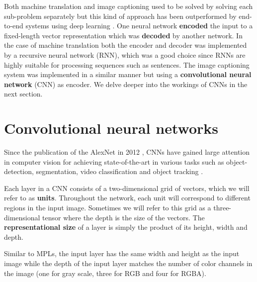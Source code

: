 Both machine translation and image captioning used to be solved by solving each sub-problem separately but this kind of approach has been outperformed by end-to-end systems using deep learning \cite{machine_translation_attention, ShowAndTell}. One neural network \textbf{encoded} the input to a fixed-length vector representation which was \textbf{decoded} by another network. In the case of machine translation both the encoder and decoder was implemented by a recursive neural network (RNN), which was a good choice since RNNs are highly suitable for processing sequences such as sentences. The image captioning system was implemented in a similar manner but using a \textbf{convolutional neural network} (CNN) as encoder. We delve deeper into the workings of CNNs in the next section.


\section{Convolutional neural networks}

Since the publication of the AlexNet in 2012 \cite{AlexNet}, CNNs have gained large attention in computer vision for achieving state-of-the-art in various tasks such as object-detection, segmentation, video classification and object tracking \cite{InceptionV3}.

Each layer in a CNN consists of a two-dimensional grid of vectors, which we will refer to as \textbf{units}. Throughout the network, each unit will correspond to different regions in the input image. Sometimes we will refer to this grid as a three-dimensional tensor where the depth is the size of the vectors. The \textbf{representational size} of a layer is simply the product of its height, width and depth.



Similar to MPLs, the input layer has the same width and height as the input image while the depth of the input layer matches the number of color channels in the image (one for gray scale, three for RGB and four for RGBA).


